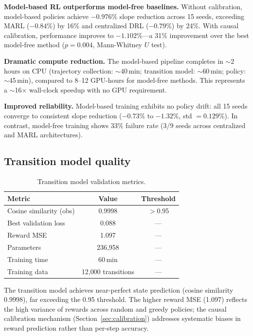 \documentclass[11pt]{article}
\begin{document}
\textbf{Model-based RL outperforms model-free baselines.} Without calibration, model-based policies achieve $-0.976\%$ slope reduction across 15 seeds, exceeding MARL ($-0.84\%$) by 16\% and centralized DRL ($-0.79\%$) by 24\%. With causal calibration, performance improves to $-1.102\%$---a 31\% improvement over the best model-free method ($p = 0.004$, Mann-Whitney $U$ test).

\textbf{Dramatic compute reduction.} The model-based pipeline completes in $\sim$2 hours on CPU (trajectory collection: $\sim$40\,min; transition model: $\sim$60\,min; policy: $\sim$45\,min), compared to 8--12 GPU-hours for model-free methods. This represents a $\sim$16$\times$ wall-clock speedup with no GPU requirement.

\textbf{Improved reliability.} Model-based training exhibits no policy drift: all 15 seeds converge to consistent slope reduction ($-0.73\%$ to $-1.32\%$, std $= 0.129\%$). In contrast, model-free training shows 33\% failure rate (3/9 seeds across centralized and MARL architectures).

\subsection{Transition model quality}
\label{sec:tm_quality}

\begin{table}[htbp]
\centering
\caption{Transition model validation metrics.}
\label{tab:tm}
\begin{tabular}{lcc}
\toprule
Metric & Value & Threshold \\
\midrule
Cosine similarity (obs) & 0.9998 & $>$0.95 \\
Best validation loss & 0.088 & --- \\
Reward MSE & 1.097 & --- \\
Parameters & 236{,}958 & --- \\
Training time & 60\,min & --- \\
Training data & 12{,}000 transitions & --- \\
\bottomrule
\end{tabular}
\end{table}

The transition model achieves near-perfect state prediction (cosine similarity 0.9998), far exceeding the 0.95 threshold. The higher reward MSE (1.097) reflects the high variance of rewards across random and greedy policies; the causal calibration mechanism (Section~\ref{sec:calibration}) addresses systematic biases in reward prediction rather than per-step accuracy.
\end{document}
